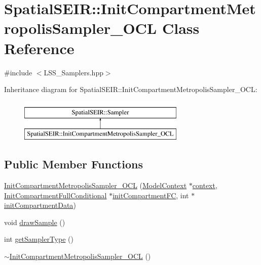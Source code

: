 \hypertarget{classSpatialSEIR_1_1InitCompartmentMetropolisSampler__OCL}{\section{Spatial\-S\-E\-I\-R\-:\-:Init\-Compartment\-Metropolis\-Sampler\-\_\-\-O\-C\-L Class Reference}
\label{classSpatialSEIR_1_1InitCompartmentMetropolisSampler__OCL}
}


{\ttfamily \#include $<$L\-S\-S\-\_\-\-Samplers.\-hpp$>$}

Inheritance diagram for Spatial\-S\-E\-I\-R\-:\-:Init\-Compartment\-Metropolis\-Sampler\-\_\-\-O\-C\-L\-:\begin{figure}[H]
\begin{center}
\leavevmode
\includegraphics[height=2.000000cm]{classSpatialSEIR_1_1InitCompartmentMetropolisSampler__OCL}
\end{center}
\end{figure}
\subsection*{Public Member Functions}
\begin{DoxyCompactItemize}
\item 
\hyperlink{classSpatialSEIR_1_1InitCompartmentMetropolisSampler__OCL_ae77e54902afe126d8c6aeb84a8b36ddc}{Init\-Compartment\-Metropolis\-Sampler\-\_\-\-O\-C\-L} (\hyperlink{classSpatialSEIR_1_1ModelContext}{Model\-Context} $\ast$\hyperlink{classSpatialSEIR_1_1InitCompartmentMetropolisSampler__OCL_af79702dd1769bd3b988afdd33d975830}{context}, \hyperlink{classSpatialSEIR_1_1InitCompartmentFullConditional}{Init\-Compartment\-Full\-Conditional} $\ast$\hyperlink{classSpatialSEIR_1_1InitCompartmentMetropolisSampler__OCL_a1081812ec3f70109ed016877c7f44db2}{init\-Compartment\-F\-C}, int $\ast$\hyperlink{classSpatialSEIR_1_1InitCompartmentMetropolisSampler__OCL_a1f3d1244aa54a5d0530e8d31e36108c8}{init\-Compartment\-Data})
\item 
void \hyperlink{classSpatialSEIR_1_1InitCompartmentMetropolisSampler__OCL_aeb2831c79b43252f3a2a48f405cfccbe}{draw\-Sample} ()
\item 
int \hyperlink{classSpatialSEIR_1_1InitCompartmentMetropolisSampler__OCL_a932637bc74c6f2f5fc251dd4a81131ae}{get\-Sampler\-Type} ()
\item 
\hyperlink{classSpatialSEIR_1_1InitCompartmentMetropolisSampler__OCL_a8da634a1bf2df13dc4fcc3b9a9c1ccab}{$\sim$\-Init\-Compartment\-Metropolis\-Sampler\-\_\-\-O\-C\-L} ()
\end{DoxyCompactItemize}
